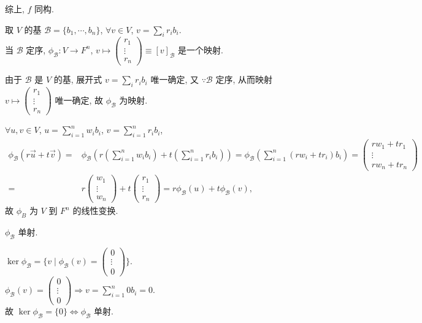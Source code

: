 \documentclass{note}
\begin{document}
综上, $f$ 同构.

取 $V$ 的基 $\mathcal{B}=\{b_1,\cdots,b_n\}$, $\forall v\in V$, $v=\sum_ir_ib_i$.\\
当 $\mathcal{B}$ 定序, $\phi_{\mathcal{B}}:V\rightarrow F^n$, $v\mapsto\begin{pmatrix}
    r_1\\
    \vdots\\
    r_n
\end{pmatrix}\equiv[v]_{\mathcal{B}}$ 是一个映射.
\begin{pf}
    由于 $\mathcal{B}$ 是 $V$ 的基, 展开式 $v=\sum_ir_ib_i$ 唯一确定, 又 $\because\mathcal{B}$ 定序, 从而映射 $v\mapsto\begin{pmatrix}
        r_1\\
        \vdots\\
        r_n
    \end{pmatrix}$ 唯一确定, 故 $\phi_{\mathcal{B}}$ 为映射.

    $\forall u,v\in V$, $u=\sum_{i=1}^nw_ib_i$, $v=\sum_{i=1}^nr_ib_i$,
    \begin{align*}
        \phi_{\mathcal{B}}(r\vec{u}+t\vec{v})=&\phi_{\mathcal{B}}\left(r\left(\sum_{i=1}^nw_ib_i\right)+t\left(\sum_{i=1}^nr_ib_i\right)\right)=\phi_{\mathcal{B}}\left(\sum_{i=1}^n(rw_i+tr_i)b_i\right)=\begin{pmatrix}
            rw_1+tr_1\\
            \vdots\\
            rw_n+tr_n
        \end{pmatrix}\\
        =&r\begin{pmatrix}
            w_1\\
            \vdots\\
            w_n
        \end{pmatrix}+t\begin{pmatrix}
            r_1\\
            \vdots\\
            r_n
        \end{pmatrix}=r\phi_{\mathcal{B}}(u)+t\phi_{\mathcal{B}}(v),
    \end{align*}
    故 $\phi_B$ 为 $V$ 到 $F^n$ 的线性变换.
\end{pf}

$\phi_{\mathcal{B}}$ 单射.
\begin{pf}
    $\ker\phi_{\mathcal{B}}=\{v\mid\phi_{\mathcal{B}}(v)=\begin{pmatrix}
        0\\
        \vdots\\
        0
    \end{pmatrix}\}$.\\
    $\phi_{\mathcal{B}}(v)=\begin{pmatrix}
        0\\
        \vdots\\
        0
    \end{pmatrix}\Longrightarrow v=\sum_{i=1}^n0b_i=0$.\\
    故 $\ker\phi_{\mathcal{B}}=\{0\}\Longleftrightarrow\phi_{\mathcal{B}}$ 单射.
\end{pf}
\end{document}
